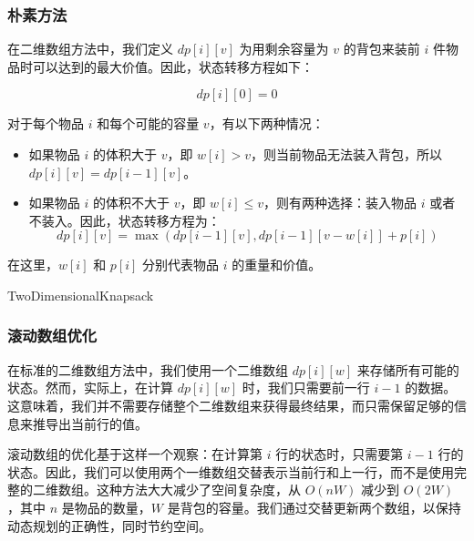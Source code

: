 \documentclass[UTF8,titlepage]{ctexart}
\numberwithin{figure}{section}
\begin{document}
\subsubsection{朴素方法}

在二维数组方法中，我们定义 $dp[i][v]$ 为用剩余容量为 $v$ 的背包来装前 $i$ 件物品时可以达到的最大价值。因此，状态转移方程如下：

\[ dp[i][0] = 0 \]

对于每个物品 $i$ 和每个可能的容量 $v$，有以下两种情况：

\begin{itemize}
  \item 如果物品 $i$ 的体积大于 $v$，即 $w[i] > v$，则当前物品无法装入背包，所以 $dp[i][v] = dp[i-1][v]$。
  \item 如果物品 $i$ 的体积不大于 $v$，即 $w[i] \leq v$，则有两种选择：装入物品 $i$ 或者不装入。因此，状态转移方程为：
  \[ dp[i][v] = \max(dp[i-1][v], dp[i-1][v-w[i]] + p[i]) \]
\end{itemize}

在这里，$w[i]$ 和 $p[i]$ 分别代表物品 $i$ 的重量和价值。

\begin{algorithm}[H]
\SetAlgoLined
\DontPrintSemicolon
{}
\caption{TwoDimensionalKnapsack}
\end{algorithm}

\subsubsection{滚动数组优化}
在标准的二维数组方法中，我们使用一个二维数组 $dp[i][w]$ 来存储所有可能的状态。然而，实际上，在计算 $dp[i][w]$ 时，我们只需要前一行 $i-1$ 的数据。这意味着，我们并不需要存储整个二维数组来获得最终结果，而只需保留足够的信息来推导出当前行的值。

滚动数组的优化基于这样一个观察：在计算第 $i$ 行的状态时，只需要第 $i-1$ 行的状态。因此，我们可以使用两个一维数组交替表示当前行和上一行，而不是使用完整的二维数组。这种方法大大减少了空间复杂度，从 \(O(nW)\) 减少到 \(O(2W)\)，其中 \(n\) 是物品的数量，\(W\) 是背包的容量。我们通过交替更新两个数组，以保持动态规划的正确性，同时节约空间。
\end{document}
